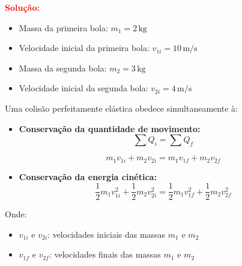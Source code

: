 \begin{flushleft}
\begin{center}
\end{center}

\textcolor{red}{\textbf{Solução:}}\\

\begin{itemize}
    \item Massa da primeira bola: \(m_1 = 2\,\text{kg}\)
    \item Velocidade inicial da primeira bola: \(v_{1i} = 10\,\text{m/s}\)
    \item Massa da segunda bola: \(m_2 = 3\,\text{kg}\)
    \item Velocidade inicial da segunda bola: \(v_{2i} = 4\,\text{m/s}\)
\end{itemize}

Uma colisão perfeitamente elástica obedece simultaneamente à:

\begin{itemize}
    \item \textbf{Conservação da quantidade de movimento:}
    \[
        \sum Q_{i} = \sum Q_{f}
    \]
    
    \[
    m_1v_{1i} + m_2v_{2i} = m_1v_{1f} + m_2v_{2f}
    \]
    \item \textbf{Conservação da energia cinética:}
    \[
    \frac{1}{2}m_1v_{1i}^2 + \frac{1}{2}m_2v_{2i}^2 = \frac{1}{2}m_1v_{1f}^2 + \frac{1}{2}m_2v_{2f}^2
    \]
\end{itemize}

Onde:
\begin{itemize}
    \item \(v_{1i}\) e \(v_{2i}\): velocidades iniciais das massas \(m_1\) e \(m_2\)
    \item \(v_{1f}\) e \(v_{2f}\): velocidades finais das massas \(m_1\) e \(m_2\)
\end{itemize}


\end{flushleft}

